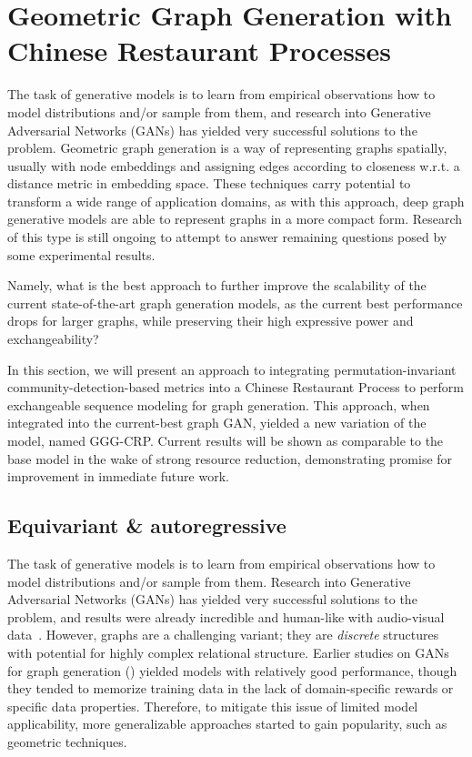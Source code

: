 \section{Geometric Graph Generation with Chinese Restaurant Processes}
\label{sec: gggcrp}

The task of generative models is to learn from empirical observations how to model distributions and/or sample from them, and research into Generative Adversarial Networks (GANs) has yielded very successful solutions to the problem. Geometric graph generation is a way of representing graphs spatially, usually with node embeddings and assigning edges according to closeness w.r.t. a distance metric in embedding space. These techniques carry potential to transform a wide range of application domains, as with this approach, deep graph generative models are able to represent graphs in a more compact form. Research of this type is still ongoing to attempt to answer remaining questions posed by some experimental results. 

Namely, what is the best approach to further improve the scalability of the current state-of-the-art graph generation models, as the current best performance drops for larger graphs, while preserving their high expressive power and exchangeability?

In this section, we will present an approach to integrating permutation-invariant community-detection-based metrics into a Chinese Restaurant Process to perform exchangeable sequence modeling for graph generation. This approach, when integrated into the current-best graph GAN, yielded a new variation of the model, named GGG-CRP. Current results will be shown as comparable to the base model in the wake of strong resource reduction, demonstrating promise for improvement in immediate future work.

\subsection{Equivariant \& autoregressive}

The task of generative models is to learn from empirical observations how to
model distributions and/or sample from them. Research into Generative Adversarial Networks (GANs) has yielded very successful solutions to the problem, and results were already incredible and human-like with audio-visual data~\cite{karras_analyzing_2020}. However, graphs are a challenging variant; they are \emph{discrete} structures with potential for highly complex relational structure. 
Earlier studies on GANs for graph generation (\cite{bojchevski_netgan_2018, de_cao_molgan_2018}) yielded models with relatively good performance, though they tended to memorize training data in the lack of domain-specific rewards or specific data properties. Therefore, to mitigate this issue of limited model applicability, more generalizable approaches started to gain popularity, such as geometric techniques.


